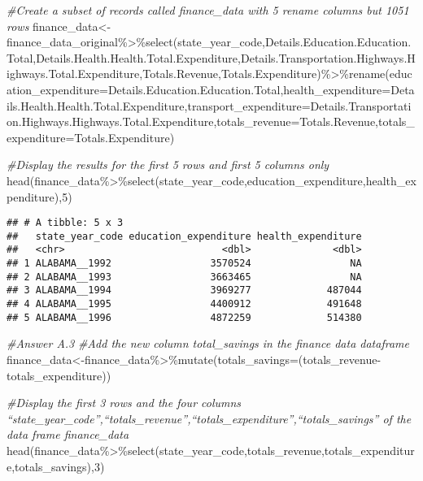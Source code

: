\documentclass[
]{article}
\newenvironment{Shaded}{\begin{snugshade}}{\end{snugshade}}
\newcommand{\AttributeTok}[1]{\textcolor[rgb]{0.77,0.63,0.00}{#1}}
\newcommand{\CommentTok}[1]{\textcolor[rgb]{0.56,0.35,0.01}{\textit{#1}}}
\newcommand{\DecValTok}[1]{\textcolor[rgb]{0.00,0.00,0.81}{#1}}
\newcommand{\FunctionTok}[1]{\textcolor[rgb]{0.00,0.00,0.00}{#1}}
\newcommand{\NormalTok}[1]{#1}
\newcommand{\OtherTok}[1]{\textcolor[rgb]{0.56,0.35,0.01}{#1}}
\newcommand{\SpecialCharTok}[1]{\textcolor[rgb]{0.00,0.00,0.00}{#1}}
\begin{document}
\begin{Shaded}
\begin{Highlighting}[]
\CommentTok{\#Create a subset of records called finance\_data with 5 rename columns but 1051 rows}
\NormalTok{finance\_data}\OtherTok{\textless{}{-}}\NormalTok{finance\_data\_original}\SpecialCharTok{\%\textgreater{}\%}\FunctionTok{select}\NormalTok{(state\_year\_code,Details.Education.Education.Total,Details.Health.Health.Total.Expenditure,Details.Transportation.Highways.Highways.Total.Expenditure,Totals.Revenue,Totals.Expenditure)}\SpecialCharTok{\%\textgreater{}\%}\FunctionTok{rename}\NormalTok{(}\AttributeTok{education\_expenditure=}\NormalTok{Details.Education.Education.Total,}\AttributeTok{health\_expenditure=}\NormalTok{Details.Health.Health.Total.Expenditure,}\AttributeTok{transport\_expenditure=}\NormalTok{Details.Transportation.Highways.Highways.Total.Expenditure,}\AttributeTok{totals\_revenue=}\NormalTok{Totals.Revenue,}\AttributeTok{totals\_expenditure=}\NormalTok{Totals.Expenditure) }


\CommentTok{\#Display the results for the first 5 rows and first 5 columns only}
\FunctionTok{head}\NormalTok{(finance\_data}\SpecialCharTok{\%\textgreater{}\%}\FunctionTok{select}\NormalTok{(state\_year\_code,education\_expenditure,health\_expenditure),}\DecValTok{5}\NormalTok{)}
\end{Highlighting}
\end{Shaded}

\begin{verbatim}
## # A tibble: 5 x 3
##   state_year_code education_expenditure health_expenditure
##   <chr>                           <dbl>              <dbl>
## 1 ALABAMA__1992                 3570524                 NA
## 2 ALABAMA__1993                 3663465                 NA
## 3 ALABAMA__1994                 3969277             487044
## 4 ALABAMA__1995                 4400912             491648
## 5 ALABAMA__1996                 4872259             514380
\end{verbatim}

\begin{Shaded}
\begin{Highlighting}[]
\CommentTok{\#Answer A.3}
\CommentTok{\#Add the new column  total\_savings in the finance data dataframe}
\NormalTok{finance\_data}\OtherTok{\textless{}{-}}\NormalTok{finance\_data}\SpecialCharTok{\%\textgreater{}\%}\FunctionTok{mutate}\NormalTok{(}\AttributeTok{totals\_savings=}\NormalTok{(totals\_revenue}\SpecialCharTok{{-}}\NormalTok{totals\_expenditure))}

\CommentTok{\#Display the first 3 rows and the four columns “state\_year\_code”,“totals\_revenue”,“totals\_expenditure”,“totals\_savings” of the data frame finance\_data}
\FunctionTok{head}\NormalTok{(finance\_data}\SpecialCharTok{\%\textgreater{}\%}\FunctionTok{select}\NormalTok{(state\_year\_code,totals\_revenue,totals\_expenditure,totals\_savings),}\DecValTok{3}\NormalTok{)}
\end{Highlighting}
\end{Shaded}
\end{document}
